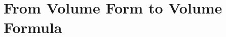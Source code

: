 \documentclass{article}
\theoremstyle{definition}
\theoremstyle{theorem}
\begin{document}





\section{From Volume Form to Volume Formula}
\end{document}
